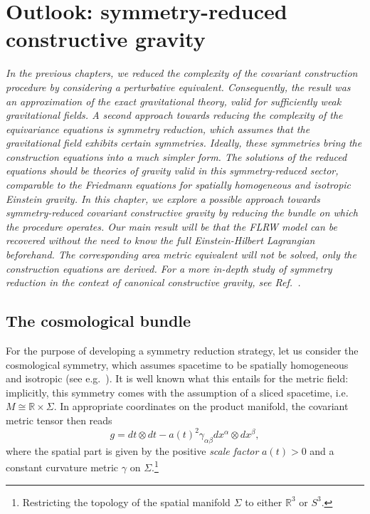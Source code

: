 \chapter{Outlook: symmetry-reduced constructive gravity}\label{chapter_cosmo}

\textit{In the previous chapters, we reduced the complexity of the covariant construction procedure by considering a perturbative equivalent. Consequently, the result was an approximation of the exact gravitational theory, valid for sufficiently weak gravitational fields. A second approach towards reducing the complexity of the equivariance equations is symmetry reduction, which assumes that the gravitational field exhibits certain symmetries. Ideally, these symmetries bring the construction equations into a much simpler form. The solutions of the reduced equations should be theories of gravity valid in this symmetry-reduced sector, comparable to the Friedmann equations for spatially homogeneous and isotropic Einstein gravity. In this chapter, we explore a possible approach towards symmetry-reduced covariant constructive gravity by reducing the bundle on which the procedure operates. Our main result will be that the FLRW model can be recovered without the need to know the full Einstein-Hilbert Lagrangian beforehand. The corresponding area metric equivalent will not be solved, only the construction equations are derived. For a more in-depth study of symmetry reduction in the context of canonical constructive gravity, see Ref.~\cite{Duell_2020}.}

\section{The cosmological bundle}
For the purpose of developing a symmetry reduction strategy, let us consider the cosmological symmetry, which assumes spacetime to be spatially homogeneous and isotropic (see e.g.~\cite{Weinberg_1972,Wald_1984}). It is well known what this entails for the metric field: implicitly, this symmetry comes with the assumption of a sliced spacetime, i.e.\ $M \cong \mathbb R \times \Sigma$. In appropriate coordinates on the product manifold, the covariant metric tensor then reads \cite{Weinberg_1972,Katanaev_2016}
\begin{equation}
  g = dt \otimes dt - a(t)^2 \gamma_{\alpha\beta} dx^\alpha \otimes dx^\beta,
\end{equation}
where the spatial part is given by the positive \emph{scale factor} $a(t) > 0$ and a constant curvature metric $\gamma$ on $\Sigma$.\footnote{Restricting the topology of the spatial manifold $\Sigma$ to either $\mathbb R^3$ or $S^3$.}

